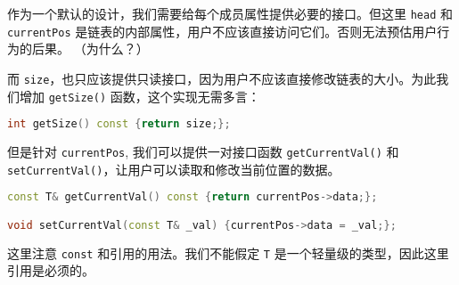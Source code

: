 \documentclass[a4paper]{ctexart}
\theoremstyle{definition}
\theoremstyle{definition}
\begin{document}
作为一个默认的设计，我们需要给每个成员属性提供必要的接口。但这里 
\verb|head| 和 \verb|currentPos| 是链表的内部属性，用户不应该直接访问它们。否则无法预估用户行为的后果。
（为什么？）

而 \verb|size|，也只应该提供只读接口，因为用户不应该直接修改链表的大小。为此我们增加 \verb|getSize()| 函数，这个实现无需多言：
\begin{lstlisting}[language=C++]
int getSize() const {return size;};
\end{lstlisting}

但是针对 \verb|currentPos|, 我们可以提供一对接口函数 \verb|getCurrentVal()| 和 \verb|setCurrentVal()|，让用户可以读取和修改当前位置的数据。

\begin{lstlisting}[language=C++]
const T& getCurrentVal() const {return currentPos->data;};

void setCurrentVal(const T& _val) {currentPos->data = _val;};
\end{lstlisting}

这里注意 \verb|const| 和引用的用法。我们不能假定 \verb|T| 是一个轻量级的类型，因此这里引用是必须的。
\end{document}
